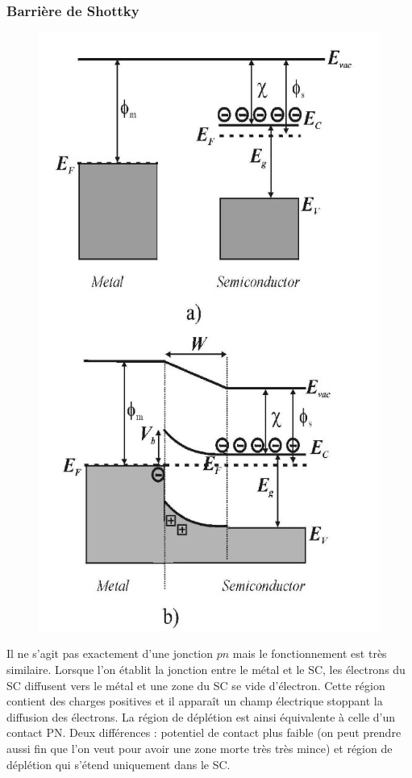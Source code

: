 \subsubsection{Barrière de Shottky}
	\begin{figure}
	\vspace{-5mm}
	\includegraphics[scale=0.27]{ch9/image3}
	\end{figure}
Il ne s'agit pas exactement d'une jonction $pn$ mais le fonctionnement est très similaire. 
Lorsque l'on établit la jonction entre le métal et le SC, les électrons du SC diffusent vers
le métal et une zone du SC se vide d'électron. Cette région contient des charges positives et
il apparaît un champ électrique stoppant la diffusion des électrons. La région de déplétion est
ainsi équivalente à celle d'un contact PN. Deux différences : potentiel de contact plus faible
(on peut prendre aussi fin que l'on veut pour avoir une zone morte très très mince) et région
de déplétion qui s'étend uniquement dans le SC.

